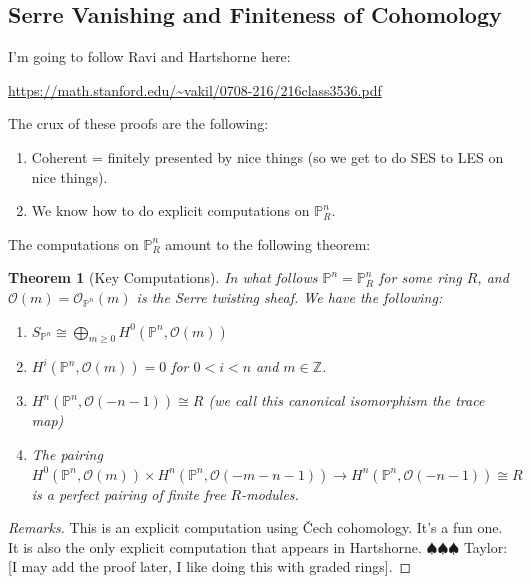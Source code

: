\documentclass[12pt]{article}
\numberwithin{equation}{section}
\newtheorem{theorem}{Theorem}[subsection]
\theoremstyle{definition}
\theoremstyle{remark}
\newcommand{\ZZ}{\mathbb{Z}}
\newcommand{\Ocal}{\mathcal{O}}
\newcommand{\PP}{\mathbb{P}}
\newcommand{\taylor}[1]{{\color{blue} \sf $\spadesuit\spadesuit\spadesuit$ Taylor: [#1]}}
\begin{document}
\subsection{Serre Vanishing and Finiteness of Cohomology}
I'm going to follow Ravi and Hartshorne here:
\begin{center}
	\url{https://math.stanford.edu/~vakil/0708-216/216class3536.pdf}
\end{center}
The crux of these proofs are the following:
\begin{enumerate}
	\item Coherent = finitely presented by nice things (so we get to do SES to LES on nice things).
	\item We know how to do explicit computations on $\PP^n_R$.
\end{enumerate}
The computations on $\PP^n_R$ amount to the following theorem:

\begin{theorem}[Key Computations]\label{thm:cohomology-of-projective-space-2}
	In what follows $\PP^n=\PP^n_R$ for some ring $R$, and $\Ocal(m) = \Ocal_{\PP^n}(m)$ is the Serre twisting sheaf. 
	We have the following:
	\begin{enumerate}
		\item $S_{\PP^n} \cong \bigoplus_{m\geq 0} H^0(\PP^n, \Ocal(m))$
		\item $H^i(\PP^n,\Ocal(m))=0$ for $0<i<n$ and $m\in \ZZ$.
		\item $H^n(\PP^n,\Ocal(-n-1))\cong R$ (we call this canonical isomorphism the trace map)
		\item The pairing $H^0(\PP^n,\Ocal(m))\times H^n(\PP^n,\Ocal(-m-n-1)) \to H^n(\PP^n,\Ocal(-n-1)) \cong R$ is a perfect pairing of finite free $R$-modules.
	\end{enumerate}
\end{theorem}
\begin{proof}[Remarks]
	This is an explicit computation using \v{C}ech cohomology. 
	It's a fun one. 
	It is also the only explicit computation that appears in Hartshorne. 
	\taylor{I may add the proof later, I like doing this with graded rings}.
\end{proof}
\end{document}

